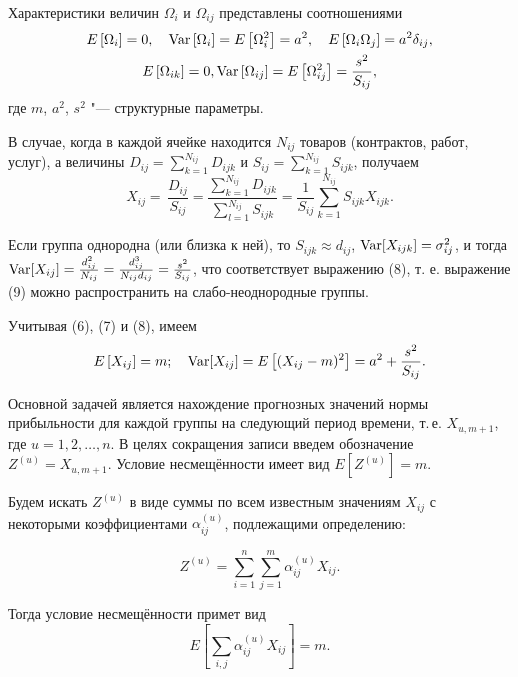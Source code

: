 Характеристики величин $\Omega _i $ и $\Omega _{ij} $ представлены
соотношениями
\begin{gather}
 E\left[ {\Omega _i } \right]=0,
\quad
{\rm Var}\left[ {\Omega _i } \right]=E\left[ \Omega _i^2  \right]=a^2,
\quad
E\left[\Omega _i \Omega _j \right]=a^2\delta _{ij} ,
\\
E\left[ {\Omega _{ik} } \right]=0,
{\rm Var}\left[ {\Omega _{ij} } \right]=E\left[ {\Omega _{ij}^2 } \right]=\frac{s^2}{S_{ij} },
\end{gather}
где $m$, $a^2$, $s^2$ "--- структурные параметры.

В случае, когда в каждой ячейке находится $N_{ij} $ товаров (контрактов,
работ, услуг), а величины $D_{ij} =\sum_{k=1}^{N_{ij} } {D_{ijk} } $
и $S_{ij} =\sum_{k=1}^{N_{ij} } {S_{ijk} } $, получаем
\begin{equation}
 X_{ij} =\,\frac{D_{ij} }{S_{ij} }=\frac{\sum_{k=1}^{N_{ij} } {D_{ijk} } }{\sum_{l=1}^{N_{ij} } {S_{ijk} } }=\frac{1}{S_{ij} }\sum_{k=1}^{N_{ij} } {S_{ijk} } X_{ijk} .
\end{equation}

Если группа однородна (или близка к ней), то $S_{ijk} \approx d_{ij} $,
${\rm Var}[X_{ijk} ]=\sigma _{ij}^2 $, и тогда
${\rm Var}[X_{ij} ]=\frac{d_{ij}^2 }{N_{ij} }=\frac{d_{ij}^3 }{N_{ij} d_{ij} }=\frac{s^2}{S_{ij} }$, что
соответствует выражению (8), т. е. выражение (9) можно распространить на
слабо-неоднородные группы.

Учитывая (6), (7) и (8), имеем
\begin{equation}
 E\left[X_{ij} \right]=m; \quad {\rm Var}[X_{ij} ]=E \left[(X_{ij} -m)^2\right]=a^2+\frac{s^2}{S_{ij} }.
\end{equation}

Основной задачей является нахождение прогнозных значений нормы прибыльности
для каждой группы на следующий период времени, т.\,е. $X_{u,m+1} $,
где $u=1, 2, \dots, n$.
В целях сокращения записи введем обозначение $Z^{(u)}=X_{u,m+1} $.
Условие несмещённости имеет вид $E[Z^{(u)}]=m$.

Будем искать $Z^{(u)}$ в виде суммы по всем известным значениям $X_{ij} $ с
некоторыми коэффициентами $\alpha _{ij}^{(u)} $, подлежащими определению:

$$Z^{(u)}=\sum_{i=1}^n {\sum_{j=1}^m {\alpha _{ij}^{(u)} X_{ij} } } .$$

Тогда условие несмещённости примет вид
\begin{equation}
E\left[\sum_{i,j} \alpha _{ij}^{(u)} X_{ij} \right]=m  .
\end{equation}

